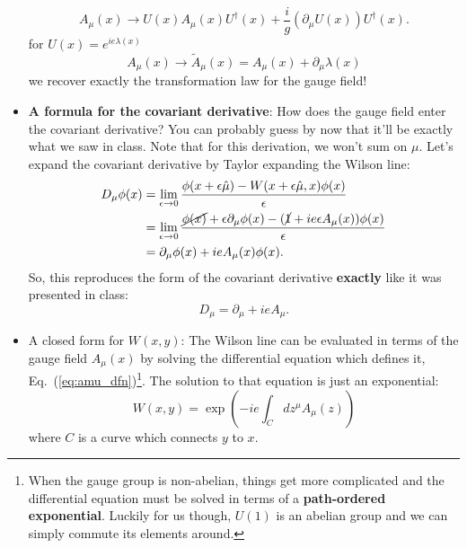 \documentclass[12pt, oneside]{article}   	%
\theoremstyle{definition}
\begin{document}
\begin{itemize}
{	\begin{equation}
		A_\mu(x)\longrightarrow U(x) A_\mu(x) U^\dagger(x) + \frac{i}{g} (\partial_\mu U(x)) U^\dagger(x).
	\end{equation}
	} 
	for $U(x) = e^{ie\lambda(x)}$
	\begin{equation}
		A_\mu(x)\longrightarrow \tilde A_\mu(x) = A_\mu(x) + \partial_\mu \lambda(x)
	\end{equation}
	we recover exactly the transformation law for the gauge field!
	
	\item \textbf{A formula for the covariant derivative}: How does the gauge field enter the covariant derivative? You can probably guess by now that it'll be exactly what we saw in class. Note that for this derivation, we won't sum on $\mu$. Let's expand the covariant derivative by Taylor expanding the Wilson line:
	\begin{align} \begin{split}
		D_\mu\phi(x) &= \lim_{\epsilon\rightarrow 0} \frac{\phi(x + \epsilon \hat{\mu}) - W(x + \epsilon \hat{\mu}, x) \phi(x)}{\epsilon} \\
		&= \lim_{\epsilon\rightarrow 0} \frac{\cancel{\phi(x)} + \epsilon \partial_\mu \phi(x) - (\cancel{1} + ie \epsilon A_\mu(x) ) \phi(x)}{\epsilon} \\
		&= \partial_\mu\phi(x) + i e A_\mu(x) \phi(x).
	\end{split} \end{align}
	So, this reproduces the form of the covariant derivative \textbf{exactly} like it was presented in class:
	\begin{equation}
		D_\mu = \partial_\mu + i e A_\mu.
	\end{equation}
	
	\item A closed form for $W(x, y)$: The Wilson line can be evaluated in terms of the gauge field $A_\mu(x)$ by solving the differential equation which defines it, Eq.~(\ref{eq:amu_dfn})\footnote{When the gauge group is non-abelian, things get more complicated and the differential equation must be solved in terms of a \textbf{path-ordered exponential}. Luckily for us though, $U(1)$ is an abelian group and we can simply commute its elements around.}. The solution to that equation is just an exponential:
	\begin{equation}
		W(x, y) = \exp\left(-ie \int_C dz^\mu A_\mu(z)\right)
	\end{equation}
	where $C$ is a curve which connects $y$ to $x$. 
	

\end{itemize}
\end{document}
